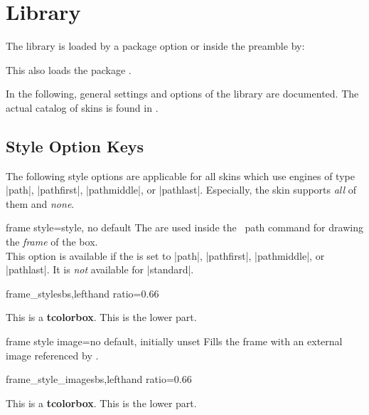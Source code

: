 \clearpage
\section{Library }\label{sec:skins}%
%
The library is loaded by a package option or inside the preamble by:
\begin{dispListing}
\end{dispListing}
This also loads the package .

In the following, general settings and options of the library are
documented.
The actual catalog of skins is found in .

\subsection{Style Option Keys}\label{subsec:addstyleoptions}
The following style options are applicable for all skins which
use engines of type |path|, |pathfirst|, |pathmiddle|, or |pathlast|.
Especially, the skin  supports \emph{all} of them
and  \emph{none}.

\begin{docTcbKey}{frame style}{=}{style, no default}
  The  are used inside the \tikzname\ path command
  for drawing the \emph{frame} of the box.\\
  This option is available if the  is set to
  |path|, |pathfirst|, |pathmiddle|, or |pathlast|.
  It is \emph{not} available for |standard|.
\begin{exdispExample*}{frame_style}{sbs,lefthand ratio=0.66}

\begin{tcolorbox}[enhanced,title=My title,
  frame style={left color=red!75!black,
               right color=blue!75!black}]
This is a \textbf{tcolorbox}.
\tcblower
This is the lower part.
\end{tcolorbox}
\end{exdispExample*}
\end{docTcbKey}


\begin{docTcbKey}{frame style image}{=}{no default, initially unset}
  Fills the frame with an external image referenced by .
\begin{exdispExample*}{frame_style_image}{sbs,lefthand ratio=0.66}

\begin{tcolorbox}[enhanced,title=My title,
  frame style image=blueshade.png]
This is a \textbf{tcolorbox}.
\tcblower
This is the lower part.
\end{tcolorbox}
\end{exdispExample*}
\end{docTcbKey}

